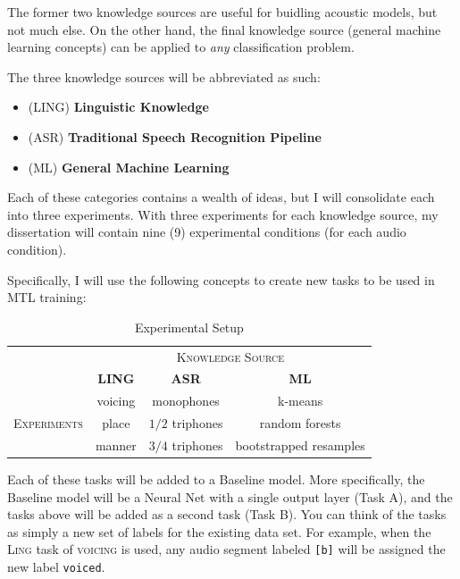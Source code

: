 \documentclass[10pt,a4paper]{article}
\begin{document}
The former two knowledge sources are useful for buidling acoustic models, but not much else. On the other hand, the final knowledge source (general machine learning concepts) can be applied to \textit{any} classification problem.

The three knowledge sources will be abbreviated as such:
  
\begin{itemize}
\item  (\textsc{LING}) \textbf{Linguistic Knowledge} 
\item (\textsc{ASR}) \textbf{Traditional Speech Recognition Pipeline}
\item (\textsc{ML}) \textbf{General Machine Learning}
\end{itemize}


Each of these categories contains a wealth of ideas, but I will consolidate each into three experiments. With three experiments for each knowledge source, my dissertation will contain nine (9) experimental conditions (for each audio condition).

Specifically, I will use the following concepts to create new tasks to be used in MTL training:

\begin{table}[htbp]
  \centering
  \begin{adjustbox}{width=.75\textwidth}
    \begin{tabular}{cccc}
      \toprule
      & \multicolumn{3}{c}{\textsc{Knowledge Source}}\\
      & \textbf{LING} & \textbf{ASR} & \textbf{ML}\\
      \midrule
      \multirow{3}{*}{\textsc{Experiments}} & voicing & monophones &  k-means \\
      & place & $1/2$ triphones & random forests  \\
      & manner & $3/4$ triphones &  bootstrapped resamples  \\
      \bottomrule
    \end{tabular}
    \label{table:data}
  \end{adjustbox}
  
  \caption{Experimental Setup}
  
\end{table}


Each of these tasks will be added to a Baseline model. More specifically, the Baseline model will be a Neural Net with a single output layer (Task A), and the tasks above will be added as a second task (Task B). You can think of the tasks as simply a new set of labels for the existing data set. For example, when the \textsc{Ling} task of \textsc{voicing} is used, any audio segment labeled \texttt{[b]} will be assigned the new label \texttt{voiced}.
\end{document}
